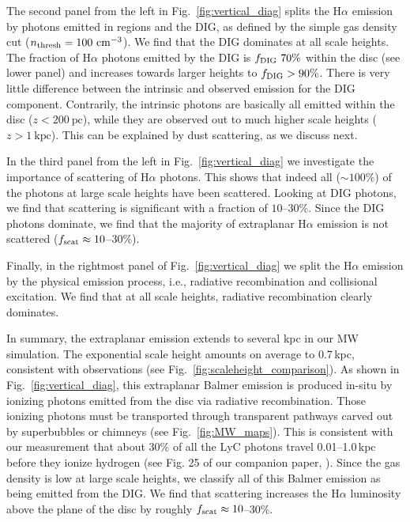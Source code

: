 \documentclass[fleqn,usenatbib]{mnras}
\begin{document}
The second panel from the left in Fig.~\ref{fig:vertical_diag} splits the H$\alpha$ emission by photons emitted in  regions and the DIG, as defined by the simple gas density cut ($n_{\rm thresh}=100~\mathrm{cm}^{-3}$). We find that the DIG dominates at all scale heights. The fraction of H$\alpha$ photons emitted by the DIG is $f_{\rm DIG}~70\%$ within the disc (see lower panel) and increases towards larger heights to $f_{\rm DIG}>90\%$. There is very little difference between the intrinsic and observed emission for the DIG component. Contrarily, the intrinsic  photons are basically all emitted within the disc ($z<200~\mathrm{pc}$), while they are observed out to much higher scale heights ($z>1~\mathrm{kpc}$). This can be explained by dust scattering, as we discuss next.

In the third panel from the left in Fig.~\ref{fig:vertical_diag} we investigate the importance of scattering of H$\alpha$ photons. This shows that indeed all ($\sim100\%$) of the  photons at large scale heights have been scattered. Looking at DIG photons, we find that scattering is significant with a fraction of $10$--$30\%$. Since the DIG photons dominate, we find that the majority of extraplanar H$\alpha$ emission is not scattered ($f_{\rm scat}\approx10$--$30\%$).

Finally, in the rightmost panel of Fig.~\ref{fig:vertical_diag} we split the H$\alpha$ emission by the physical emission process, i.e., radiative recombination and collisional excitation. We find that at all scale heights, radiative recombination clearly dominates.

In summary, the extraplanar emission extends to several kpc in our MW simulation. The exponential scale height amounts on average to 0.7\,kpc, consistent with observations (see Fig.~\ref{fig:scaleheight_comparison}). As shown in Fig.~\ref{fig:vertical_diag}, this extraplanar Balmer emission is produced in-situ by ionizing photons emitted from the disc via radiative recombination. Those ionizing photons must be transported through transparent pathways carved out by superbubbles or chimneys (see Fig.~\ref{fig:MW_maps}). This is consistent with our measurement that about 30\% of all the LyC photons travel 0.01--1.0\,kpc before they ionize hydrogen (see Fig. 25 of our companion paper, \citealt{smith21_rt}). Since the gas density is low at large scale heights, we classify all of this Balmer emission as being emitted from the DIG. We find that scattering increases the H$\alpha$ luminosity above the plane of the disc by roughly $f_{\rm scat}\approx10$--$30\%$.
\end{document}
